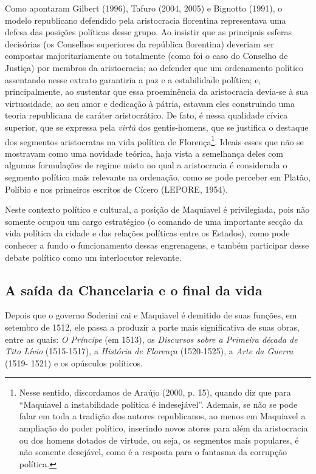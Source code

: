 Como apontaram Gilbert (1996), Tafuro (2004, 2005) e Bignotto (1991), o
modelo republicano defendido pela aristocracia florentina representava
uma defesa das posições políticas desse grupo. Ao insistir que as
principais esferas decisórias (os Conselhos superiores da república
florentina) deveriam ser compostas majoritariamente ou totalmente (como
foi o caso do Conselho de Justiça) por membros da aristocracia; ao
defender que um ordenamento político assentando nesse extrato garantiria
a paz e a estabilidade política; e, principalmente, ao sustentar que
essa proeminência da aristocracia devia-se à sua virtuosidade, ao seu
amor e dedicação à pátria, estavam eles construindo uma teoria
republicana de caráter aristocrático. De fato, é nessa qualidade cívica
superior, que se expressa pela \emph{virtù} dos gentis-homens, que se
justifica o destaque dos segmentos aristocratas na vida política de
Florença\footnote{Nesse sentido, discordamos de Araújo (2000, p. 15),
  quando diz que para ``Maquiavel a instabilidade política é
  indesejável''. Ademais, se não se pode falar em toda a tradição dos
  autores republicanos, ao menos em Maquiavel a ampliação do poder
  político, inserindo novos atores para além da aristocracia ou dos
  homens dotados de virtude, ou seja, os segmentos mais populares, é não
  somente desejável, como é a resposta para o fantasma da corrupção
  política.}. Ideais esses que não se mostravam como uma novidade
teórica, haja vista a semelhança deles com algumas formulações de regime
misto no qual a aristocracia é considerada o segmento político mais
relevante na ordenação, como se pode perceber em Platão, Políbio e nos
primeiros escritos de Cícero (LEPORE, 1954).

Neste contexto político e cultural, a posição de Maquiavel é
privilegiada, pois não somente ocupou um cargo estratégico (o comando de
uma importante secção da vida política da cidade e das relações
políticas entre os Estados), como pode conhecer a fundo o funcionamento
dessas engrenagens, e também participar desse debate político como um
interlocutor relevante.

\subsection{A saída da Chancelaria e o final da vida}

Depois que o governo Soderini cai e Maquiavel é demitido de suas
funções, em setembro de 1512, ele passa a produzir a parte mais
significativa de suas obras, entre as quais: \emph{O Príncipe} (em
1513), os \emph{Discursos sobre a Primeira década de Tito Lívio}
(1515-1517), a \emph{História de Florença} (1520-1525), a \emph{Arte da
Guerra} (1519- 1521) e os opúsculos políticos.

